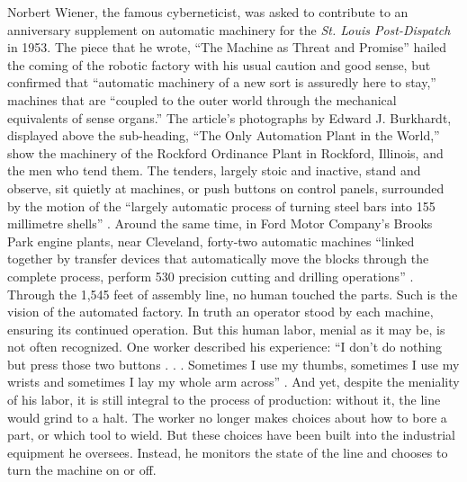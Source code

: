 Norbert Wiener, the famous cyberneticist, was asked to contribute to an
anniversary supplement on automatic machinery for the \emph{St. Louis
Post-Dispatch} in 1953. The piece that he wrote, ``The Machine as Threat
and Promise'' \cite{wienerMachineThreat} hailed the coming of the
robotic factory with his usual 
caution and good sense, but confirmed that ``automatic machinery of a
new sort is assuredly here to stay,'' machines that are ``coupled to the
outer world through the mechanical equivalents of sense organs.'' The
article's photographs by Edward J. Burkhardt, displayed above the
sub-heading, ``The Only Automation Plant in the World,'' show the
machinery of the Rockford Ordinance Plant in Rockford, Illinois, and
the men who tend them. The tenders, largely stoic and inactive, stand
and observe, sit quietly at machines, or push buttons on control
panels, surrounded by the motion of the ``largely automatic process of
turning steel bars into 155 millimetre
shells'' \cite{wienerMachineThreat}. Around the same time, in Ford
Motor Company's Brooks Park engine plants, near Cleveland, forty-two
automatic machines ``linked together by transfer devices that
automatically move the blocks through the complete process, perform
530 precision cutting and drilling operations'' \cite[p.
  9]{dieboldImpact}. Through the 1,545 feet of assembly line, no human
touched the parts. Such is the vision of the automated factory. In
truth an operator stood by each machine, ensuring its continued
operation. But this human labor, menial as it may be, is not often
recognized. One worker described his experience: ``I don't do nothing but
press those two buttons . . . Sometimes I use my thumbs, sometimes I
use my wrists and sometimes I lay my whole arm across'' \cite[p.
  10]{dieboldImpact}. And yet,
despite the meniality of his labor, it is still integral to the
process of production: without it, the line would grind to a halt. The worker
no longer makes choices about how to bore a part, or which tool to
wield. But these choices have been built into the industrial equipment
he oversees. Instead, he monitors the state of the line and chooses to
turn the machine on or off.

